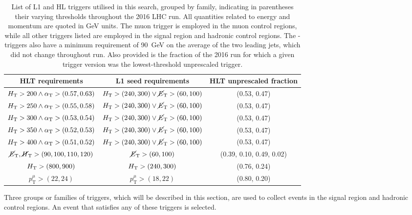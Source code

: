 \begin{table}[h]
\footnotesize
\centering
\begin{tabular}{ccc}
\hline
HLT requirements & L1 seed requirements & HLT unprescaled fraction \\
\hline\hline
$\mbox{$H_\text{T}$}>200 \land \alpha_{\text{T}}>(0.57,0.63)$ & $\mbox{$H_\text{T}$}>(240,300) \lor 
\mbox{$\cancel{E}_\text{T}$}>(60,100)$ 
& (0.53, 0.47) \\
$\mbox{$H_\text{T}$}>250 \land \alpha_{\text{T}}>(0.55,0.58)$ & $\mbox{$H_\text{T}$}>(240,300) \lor 
\mbox{$\cancel{E}_\text{T}$}>(60,100)$ 
& (0.53, 0.47) \\
$\mbox{$H_\text{T}$}>300 \land \alpha_{\text{T}}>(0.53,0.54)$ & $\mbox{$H_\text{T}$}>(240,300) \lor 
\mbox{$\cancel{E}_\text{T}$}>(60,100)$ 
& (0.53, 0.47) \\
$\mbox{$H_\text{T}$}>350 \land \alpha_{\text{T}}>(0.52,0.53)$ & $\mbox{$H_\text{T}$}>(240,300) \lor 
\mbox{$\cancel{E}_\text{T}$}>(60,100)$ 
& (0.53, 0.47) \\
$\mbox{$H_\text{T}$}>400 \land \alpha_{\text{T}}>(0.51,0.52)$ & $\mbox{$H_\text{T}$}>(240,300) \lor 
\mbox{$\cancel{E}_\text{T}$}>(60,100)$ 
& (0.53, 0.47) \\
\hline
$\mbox{$\cancel{E}_\text{T}$}, \mbox{$\cancel{H}_\text{T}$}>(90,100,110,120)$ & $\mbox{$\cancel{E}_\text{T}$}>(60,100)$ & (0.39, 
0.10, 0.49, 0.02) \\
\hline
$\mbox{$H_\text{T}$}>(800,900)$ & $\mbox{$H_\text{T}$}>(240,300)$ & (0.76, 0.24) \\
\hline
$p_{\mathrm{T}}^{\mu}>(22,24)$ & $p_{\mathrm{T}}^{\mu}>(18,22)$ & (0.80, 0.20) 
\\
\hline
\end{tabular}
\caption{List of L1 and HL triggers utilised in this search, grouped by 
family, 
indicating in parentheses their varying thresholds throughout the 2016 LHC run. 
All quantities related to energy and momentum are quoted in GeV units.
The muon trigger is employed in the muon 
control regions, while all other triggers listed are employed in the signal 
region and hadronic control regions.
The \scalht-\alphat triggers also have a minimum requirement of 90~GeV on the 
average \pt of the two leading jets, which did not change throughout run.
Also provided is the fraction of the 2016 run for which a given trigger version 
was the lowest-threshold unprescaled trigger.}
\label{tab:triggers}
\end{table}

Three groups or families of triggers, which will be described in this section, 
are used to collect events in the signal region and hadronic control regions. 
An event that satisfies any of these triggers is selected.

